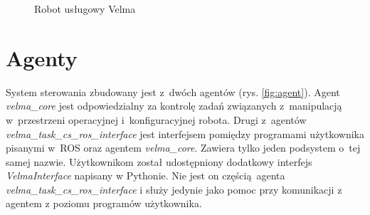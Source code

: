 	\begin{figure}
		\centering
		\hfill
		
		\caption{Robot usługowy Velma}
		\label{fig:velma}
		
	\end{figure}
	
\section{Agenty}
System sterowania \cite{bib:velma2} zbudowany jest z~dwóch agentów (rys. \ref{fig:agent}). Agent \textit{velma\_core} jest odpowiedzialny za kontrolę zadań związanych z~manipulacją w~przestrzeni operacyjnej i~konfiguracyjnej robota. Drugi z~agentów \textit{velma\_task\_cs\_ros\_interface} jest interfejsem pomiędzy programami użytkownika pisanymi w~ROS oraz agentem \textit{velma\_core}. Zawiera tylko jeden podsystem o~tej samej nazwie. Użytkownikom został udostępniony dodatkowy interfejs \textit{VelmaInterface} napisany w Pythonie. Nie  jest on częścią agenta \textit{velma\_task\_cs\_ros\_interface} i służy jedynie jako pomoc przy komunikacji z agentem z poziomu programów użytkownika.

